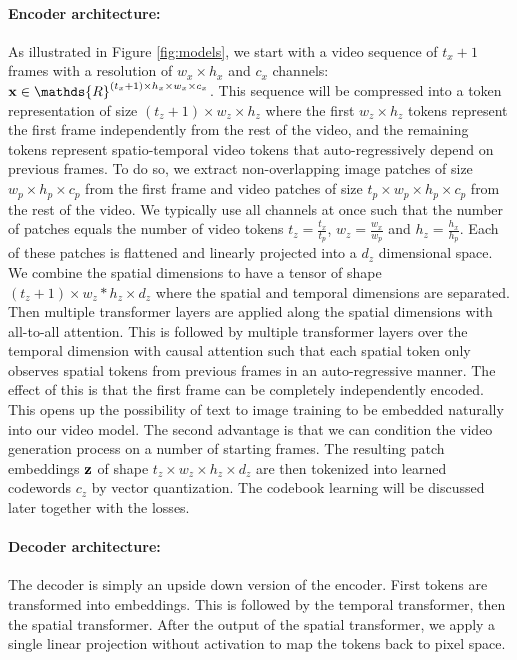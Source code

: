 \paragraph{Encoder architecture:}
As illustrated in Figure \ref{fig:models}, we start with a video sequence of $t_x + 1$ frames with a resolution of $w_x\times h_x$ and $c_x$ channels: $\bx \in \mathds{R}^{(t_x + 1) \times h_x \times w_x \times c_x}$. This sequence will be compressed into a token representation of size $(t_z + 1)\times w_z \times h_z$ where the first $w_z\times h_z$ tokens represent the first frame independently from the rest of the video, and the remaining tokens represent spatio-temporal video tokens that auto-regressively depend on previous frames. 
To do so, we extract non-overlapping image patches of size $w_p \times h_p \times c_p$ from the first frame and video patches of size $t_p\times w_p \times h_p \times c_p$ from the rest of the video.
We typically use all channels at once such that the number of patches equals the number of video tokens $t_z=\frac{t_x}{t_p}$, $w_z=\frac{w_x}{w_p}$ and  $h_z=\frac{h_x}{h_p}$.
Each of these patches is flattened and linearly projected into a $d_z$ dimensional space.
We combine the spatial dimensions to have a tensor of shape $(t_z + 1)\times w_z*h_z \times d_z$ where the spatial and temporal dimensions are separated.
Then multiple transformer layers are applied along the spatial dimensions with all-to-all attention.
This is followed by multiple transformer layers over the temporal dimension with causal attention such that each spatial token only observes spatial tokens from previous frames in an auto-regressive manner.
The effect of this is that the first frame can be completely independently encoded.
This opens up the possibility of text to image training to be embedded naturally into our video model.
The second advantage is that we can condition the video generation process on a number of starting frames. 
The resulting patch embeddings $\mathbf{z}$ of shape $t_z\times w_z \times h_z \times d_z$ are then tokenized into learned codewords $c_z$ by vector quantization.
The codebook learning will be discussed later together with the losses.

\paragraph{Decoder architecture:}
The \cvivit decoder is simply an upside down version of the encoder. First tokens are transformed into embeddings. This is followed by the temporal transformer, then the spatial transformer.
After the output of the spatial transformer, we apply a single linear projection without activation to map the tokens back to pixel space.

